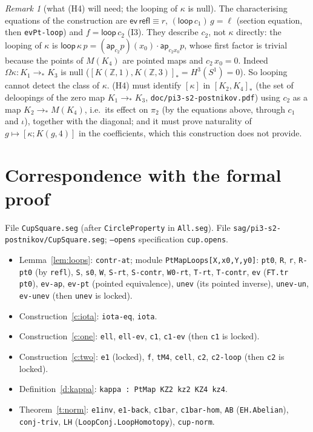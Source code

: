 \documentclass[11pt]{amsart}
\theoremstyle{definition}
\theoremstyle{remark}
\newtheorem{remark}[theorem]{Remark}
\newcommand{\Om}{\Omega}
\newcommand{\Z}{\mathbb{Z}}
\newcommand{\code}[1]{\texttt{#1}}
\newcommand{\cc}{\cdot}
\newcommand{\refl}{\mathsf{refl}}
\newcommand{\ev}{\mathsf{ev}}
\newcommand{\lp}{\mathsf{loop}}
\begin{document}
\begin{remark}[what (H4) will need; the looping of $\kappa$ is null]
The characterising equations of the construction are
$\ev\,\refl\equiv r$, $(\lp\,c_1)\,g=\ell$ (section equation, then
\code{evPt-loop}) and $f=\lp\,c_2$ (I3). They describe $c_2$, not
$\kappa$ directly: the looping of $\kappa$ is
$\lp\,\kappa\,p=(\mathsf{ap}_{c_2}p)(x_0)\cc\mathsf{ap}_{c_2x_0}p$, whose
first factor is trivial because the points of $M(K_4)$ are pointed maps
and $c_2\,x_0=0$. Indeed $\Om\kappa:K_1\to_*K_3$ is null
($[K(\Z,1),K(\Z,3)]_*=H^3(S^1)=0$). So looping cannot detect the class of
$\kappa$. (H4) must identify $[\kappa]$ in $[K_2,K_4]_*$ (the set of
deloopings of the zero map $K_1\to_*K_3$, \code{doc/pi3-s2-postnikov.pdf})
using $c_2$ as a map $K_2\to_*M(K_4)$, i.e.\ its effect on $\pi_2$ (by the
equations above, through $c_1$ and $\iota$), together with the diagonal;
and it must prove naturality of $g\mapsto[\kappa;K(g,4)]$ in the
coefficients, which this construction does not provide.
\end{remark}

\section{Correspondence with the formal proof}\label{sec:corr}
File \code{CupSquare.seg} (after \code{CircleProperty} in \code{All.seg}).
File \code{sag/pi3-s2-postnikov/CupSquare.seg}; \code{--opens} specification
\code{cup.opens}.
\begin{itemize}
\item Lemma~\ref{lem:loops}: \code{contr-at}; module \code{PtMapLoops[X,x0,Y,y0]}:
  \code{pt0}, \code{R}, \code{r}, \code{R-pt0} (by \code{refl}), \code{S},
  \code{s0}, \code{W}, \code{S-rt}, \code{S-contr}, \code{W0-rt}, \code{T-rt},
  \code{T-contr}, \code{ev} (\code{FT.tr pt0}), \code{ev-ap}, \code{ev-pt}
  (pointed equivalence), \code{unev} (its pointed inverse), \code{unev-un},
  \code{ev-unev} (then \code{unev} is locked).
\item Construction~\ref{c:iota}: \code{iota-eq}, \code{iota}.
\item Construction~\ref{c:one}: \code{ell}, \code{ell-ev}, \code{c1},
  \code{c1-ev} (then \code{c1} is locked).
\item Construction~\ref{c:two}: \code{e1} (locked), \code{f}, \code{tM4},
  \code{cell}, \code{c2}, \code{c2-loop} (then \code{c2} is locked).
\item Definition~\ref{d:kappa}: \code{kappa : PtMap KZ2 kz2 KZ4 kz4}.
\item Theorem~\ref{t:norm}: \code{e1inv}, \code{e1-back}, \code{c1bar},
  \code{c1bar-hom}, \code{AB} (\code{EH.Abelian}), \code{conj-triv},
  \code{LH} (\code{LoopConj.LoopHomotopy}), \code{cup-norm}.
\end{itemize}
\end{document}
